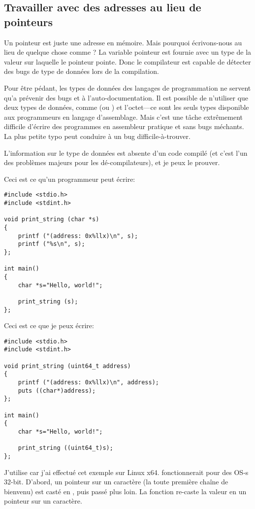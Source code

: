 \subsection{Travailler avec des adresses au lieu de pointeurs}

Un pointeur est juste une adresse en mémoire. Mais pourquoi écrivons-nous 
au lieu de quelque chose comme ?
La variable pointeur est fournie avec un type de la valeur sur laquelle le pointeur
pointe.
Donc le compilateur est capable de détecter des bugs de type de données lors de la
compilation.

Pour être pédant, les types de données des langages de programmation ne servent qu'a
prévenir des bugs et à l'auto-documentation.
Il est possible de n'utiliser que deux types de données, comme  (ou )
et l'octet---ce sont les seuls types disponible aux programmeurs en langage d'assemblage.
Mais c'est une tâche extrêmement difficile d'écrire des programmes en assembleur
pratique et sans bugs méchants.
La plus petite typo peut conduire à un bug difficile-à-trouver.

L'information sur le type de données est absente d'un code compilé (et c'est l'un
des problèmes majeurs pour les dé-compilateurs), et je peux le prouver.

Ceci est ce qu'un programmeur \CCpp peut écrire:

\begin{lstlisting}[style=customc]
#include <stdio.h>
#include <stdint.h>

void print_string (char *s)
{
	printf ("(address: 0x%llx)\n", s);
	printf ("%s\n", s);
};

int main()
{
	char *s="Hello, world!";

	print_string (s);
};
\end{lstlisting}

Ceci est ce que je peux écrire:

\begin{lstlisting}[style=customc]
#include <stdio.h>
#include <stdint.h>

void print_string (uint64_t address)
{
	printf ("(address: 0x%llx)\n", address);
	puts ((char*)address);
};

int main()
{
	char *s="Hello, world!";

	print_string ((uint64_t)s);
};
\end{lstlisting}

J'utilise  car j'ai effectué cet exemple sur Linux x64.  fonctionnerait
pour des \ac{OS}-s 32-bit.
D'abord, un pointeur sur un caractère (la toute première chaîne de bienvenu) est
casté en , puis passé plus loin.
La fonction  re-caste la valeur  en un pointeur
sur un caractère.

